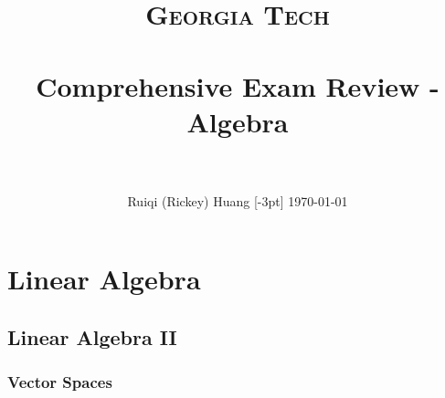 \documentclass[paper=a4, fontsize=11pt]{scrartcl}
\title{
		\usefont{OT1}{bch}{b}{n}
		\normalfont \normalsize \textsc{Georgia Tech} \\ [25pt]
		\horrule{0.5pt} \\[0.4cm]
		\huge Comprehensive Exam Review - Algebra \\
		\horrule{2pt} \\[0.5cm]
}
\author{
		\normalfont 								\normalsize
        Ruiqi (Rickey) Huang [-3pt]                 \normalsize
        \today
}
\date{}
\numberwithin{equation}{section}		%
\numberwithin{figure}{section}			%
\numberwithin{table}{section}				%
\theoremstyle{definition}
\theoremstyle{remark}
\theoremstyle{example}
\begin{document}
\maketitle
\section{Linear Algebra}

\subsection{Linear Algebra II}

\subsubsection{Vector Spaces}



\end{document}
